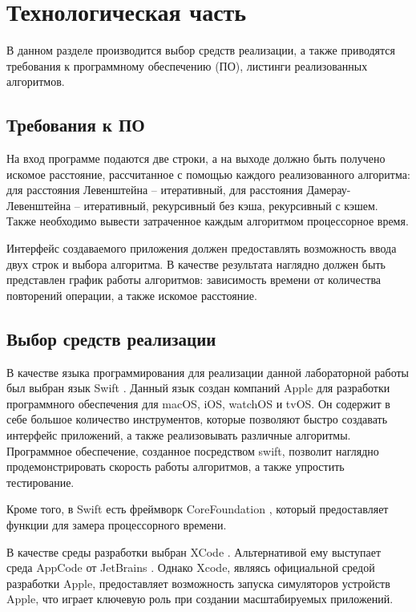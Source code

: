 \chapter{Технологическая часть}

В данном разделе производится выбор средств реализации, а также приводятся требования к программному обеспечению (ПО), листинги реализованных алгоритмов.

\section{Требования к ПО}

На вход программе подаются две строки, а на выходе должно быть получено искомое расстояние, рассчитанное с помощью каждого реализованного алгоритма: для расстояния Левенштейна -- итеративный, для расстояния Дамерау-Левенштейна -- итеративный, рекурсивный без кэша, рекурсивный с кэшем. Также необходимо вывести затраченное каждым алгоритмом процессорное время.

Интерфейс создаваемого приложения должен предоставлять возможность ввода двух строк и выбора алгоритма. В качестве результата наглядно должен быть представлен график работы алгоритмов: зависимость времени от количества повторений операции, а также искомое расстояние.

\section{Выбор средств реализации}

В качестве языка программирования для реализации данной лабораторной работы был выбран язык Swift \cite{swift}. Данный язык создан компаний Apple для разработки программного обеспечения для macOS, iOS, watchOS и tvOS. Он содержит в себе большое количество инструментов, которые позволяют быстро создавать интерфейс приложений, а также реализовывать различные алгоритмы. Программное обеспечение, созданное посредством swift, позволит наглядно продемонстрировать скорость работы алгоритмов, а также упростить тестирование.

Кроме того, в Swift есть фреймворк CoreFoundation \cite{core}, который предоставляет функции для замера процессорного времени.

В качестве среды разработки выбран XCode \cite{xcode}. Альтернативой ему выступает среда AppCode от JetBrains \cite{appcode}. Однако Xcode, являясь официальной средой разработки Apple, предоставляет возможность запуска симуляторов устройств Apple, что играет ключевую роль при создании масштабируемых приложений.  

